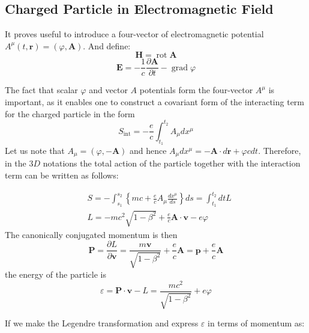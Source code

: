 \subsection{Charged Particle in Electromagnetic Field}
It proves useful to introduce a four-vector of electromagnetic potential $A^{\mu}(t, \mathbf{r})=(\varphi, \mathbf{A})$. And define:
$$
\mathbf{H}=\operatorname{rot} \mathbf{A}
$$
$$
\mathbf{E}=-\frac{1}{c} \frac{\partial \mathbf{A}}{\partial t}-\operatorname{grad} \varphi
$$

The fact that scalar $\varphi$ and vector $A$ potentials form the four-vector $A^{\mu}$ is important, as it enables one to construct a covariant form of the interacting term for the charged particle in the form
\begin{equation}
S_{\mathrm{int}}=-\frac{e}{c} \int_{t_{1}}^{t_{2}} A_{\mu} d x^{\mu}
\end{equation}
Let us note that $A_{\mu}=(\varphi,-\mathbf{A})$ and hence $A_{\mu} d x^{\mu}=-\mathbf{A} \cdot d \mathbf{r}+\varphi c d t .$ Therefore,
in the $3 D$ notations the total action of the particle together with the interaction term can be written as follows:
\begin{qt}
    \begin{equation}
\begin{aligned}
&S=-\int_{s_{1}}^{s_{2}}\left\{m c+\frac{e}{c} A_{\mu} \frac{d x^{\mu}}{d s}\right\} d s=\int_{t_{1}}^{t_{2}} d t L\\
&L=-m c^{2} \sqrt{1-\beta^{2}}+\frac{e}{c} \mathbf{A} \cdot \mathbf{v}-e \varphi
\end{aligned}
\end{equation}
The canonically conjugated momentum is then
\begin{equation}
\mathbf{P}=\frac{\partial L}{\partial \mathbf{v}}=\frac{m \mathbf{v}}{\sqrt{1-\beta^{2}}}+\frac{e}{c} \mathbf{A}=\mathbf{p}+\frac{e}{c} \mathbf{A}
\end{equation}
the energy of the particle is
\begin{equation}
\varepsilon=\mathbf{P} \cdot \mathbf{v}-L=\frac{m c^{2}}{\sqrt{1-\beta^{2}}}+e \varphi
\end{equation}
\end{qt}
If we make the Legendre transformation and express $\varepsilon$ in terms of momentum as:
